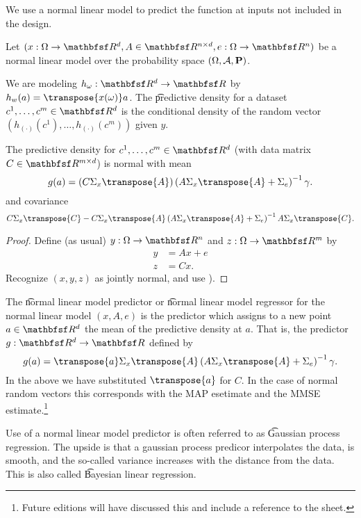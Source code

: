 

We use a normal linear model to predict the function at inputs not included in the design.


Let $(x: \Omega \to \R^d, A \in \R^{n \times d}, e: \Omega \to \R^n)$ be a normal linear model over the probability space $(\Omega, \mathcal{A}, \mathbf{P})$.


We are modeling $h_\omega: \R^d \to \R$ by $h_w(a) = \transpose{x(\omega)}a$.
The \t{predictive density} for a dataset $c^1, \dots, c^m \in \R^d$ is the conditional density of the random vector $(h_{(\cdot)}(c^1), \dots, h_{(\cdot)}(c^m))$ given $y$.


\begin{proposition}
  The predictive density for $c^1, \dots, c^m \in \R^d$ (with data matrix $C \in \R^{m \times d}$) is normal with mean
  \[
    g(a) = (C\Sigma_{x}\transpose{A})\invp{A\Sigma_{x}\transpose{A} + \Sigma_e}\gamma.
  \]
  and covariance
  \[
    C\Sigma_{x}\transpose{C} - C\Sigma_{x}\transpose{A}\invp{A\Sigma_{x}\transpose{A} + \Sigma_e}A\Sigma_{x}\transpose{C}.
  \]
  \begin{proof}
    Define (as usual) $y: \Omega \to \R^n$ and $z : \Omega \to \R^m$ by
  \[
  \begin{aligned}
    y &= Ax + e \\
    z &= Cx.
  \end{aligned}
  \]
    Recognize $(x, y, z)$ as jointly normal, and use ).
  \end{proof}
\end{proposition}


The \t{normal linear model predictor} or \t{normal linear model regressor} for the normal linear model $(x, A, e)$ is the predictor which assigns to a new point $a \in \R^d$ the mean of the predictive density at $a$.
That is, the predictor $g: \R^d \to \R$ defined by
\[
  g(a) = \transpose{a}\Sigma_{x}\transpose{A}\invp{A\Sigma_{x}\transpose{A} + \Sigma_e}\gamma.
\]
In the above we have substituted $\transpose{a}$ for $C$.
In the case of normal random vectors this corresponds with the MAP esetimate and the MMSE estimate.\footnote{Future editions will have discussed this and include a reference to the sheet.}

Use of a normal linear model predictor is often referred to as \t{Gaussian process regression}.
The upside is that a gaussian process predicor interpolates the data, is smooth, and the so-called variance increases with the distance from the data.
This is also called \t{Bayesian linear regression}.

